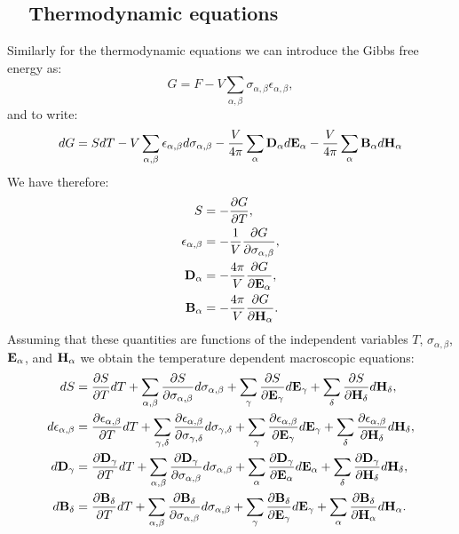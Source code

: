 \documentclass[12pt,a4paper,twoside]{report}
\begin{document}
{\subsection{\color{web-blue}\ \ Thermodynamic equations}
Similarly for the thermodynamic equations we can introduce the Gibbs
free energy as:
\begin{equation}
G=F - V \sum_{\alpha,\beta} \sigma_{\alpha,\beta} \epsilon_{\alpha,\beta},
\end{equation}
and to write:
\begin{equation}
dG=SdT - V \sum_{\alpha,\beta} \epsilon_{\alpha,\beta} d \sigma_{\alpha,\beta}
-{V \over 4 \pi} \sum_{\alpha} {\bf D}_\alpha d {\bf E}_\alpha
-{V \over 4 \pi} \sum_{\alpha} {\bf B}_\alpha d {\bf H}_\alpha
\end{equation}
We have therefore:
\begin{align}
S&=-{\partial G \over \partial T}, \\
\epsilon_{\alpha,\beta}&= -{1\over V}
{\partial G \over \partial \sigma_{\alpha,\beta}}, \\
{\bf D}_{\alpha}&= -{4 \pi \over V}
{\partial G \over \partial {\bf E}_{\alpha}}, \\
{\bf B}_{\alpha}&= -{4 \pi \over V}
{\partial G \over \partial {\bf H}_{\alpha}}.
\end{align}
Assuming that these quantities are functions of the independent variables
$T$, $\sigma_{\alpha,\beta}$, ${\bf E}_\alpha$, and ${\bf H}_\alpha$ we
obtain the temperature dependent macroscopic equations:
\begin{align}
dS&= {\partial S \over \partial T} dT+\sum_{\alpha,\beta}
{\partial S \over \partial \sigma_{\alpha,\beta}}d\sigma_{\alpha,\beta}
+\sum_\gamma{\partial S \over \partial {\bf E}_{\gamma}}d{\bf E}_{\gamma}+ 
\sum_\delta{\partial S \over \partial {\bf H}_{\delta}}d{\bf H}_{\delta}, \\
d\epsilon_{\alpha,\beta}&= 
{\partial \epsilon_{\alpha,\beta} \over \partial T} dT+\sum_{\gamma,\delta}
{\partial \epsilon_{\alpha,\beta} \over \partial 
\sigma_{\gamma,\delta}}d\sigma_{\gamma,\delta}
+\sum_\gamma{\partial \epsilon_{\alpha,\beta} \over \partial 
{\bf E}_{\gamma}}d{\bf E}_{\gamma}+ 
\sum_\delta{\partial \epsilon_{\alpha,\beta} \over \partial 
{\bf H}_{\delta}}d{\bf H}_{\delta}, \\
d{\bf D}_\gamma&= 
{\partial  {\bf D}_\gamma \over \partial T} dT+\sum_{\alpha,\beta}
{\partial {\bf D}_\gamma \over \partial \sigma_{\alpha,\beta}}
d\sigma_{\alpha,\beta}
+\sum_\alpha{\partial {\bf D}_\gamma \over \partial {\bf E}_{\alpha}}d{\bf E}_{\alpha}+ 
\sum_\delta{\partial {\bf D}_\gamma \over \partial {\bf H}_{\delta}}d{\bf H}_{\delta}, \\
d{\bf B}_\delta&= 
{\partial {\bf B}_\delta \over \partial T} dT+\sum_{\alpha,\beta}
{\partial {\bf B}_\delta \over \partial \sigma_{\alpha,\beta}}
d\sigma_{\alpha,\beta}
+\sum_\gamma{\partial {\bf B}_\delta \over \partial {\bf E}_{\gamma}}
d{\bf E}_{\gamma}+ 
\sum_\alpha{\partial {\bf B}_\delta \over \partial {\bf H}_{\alpha}}
d{\bf H}_{\alpha}. 
\end{align}

}
\end{document}
